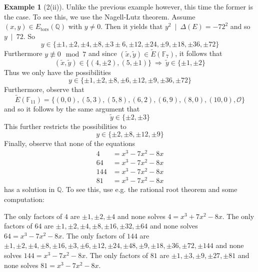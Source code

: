 \documentclass{scrartcl}
\newcommand{\F}{\mathbb{F}}
\newcommand{\Q}{\mathbb{Q}}
\renewcommand{\O}{\mathcal{O}}
\newcommand{\divides}{\ \mid \ }
\theoremstyle{definition}
\newtheorem{example}[subsection]{Example}
\begin{document}
\begin{example}[2(ii)]
    Unlike the previous example however, this time the former is the case.
    To see this, we use the Nagell-Lutz theorem.
    Assume $(x, y) \in E_{\mathrm{tors}}(\Q)$ with $y \neq 0$.
    Then it yields that $y^2 \divides \Delta(E) = -72^2$ and so $y \divides 72$.
    So
    \begin{equation*}
        y \in \{ \pm 1, \pm 2, \pm 4, \pm 8, \pm 3 \pm 6, \pm 12, \pm 24, \pm 9, \pm 18, \pm 36, \pm 72 \}
    \end{equation*}
    Furthermore $y \not\equiv 0 \mod 7$ and since $(\tilde{x}, \tilde{y}) \in \tilde{E}(\F_7)$, it follows that
    \begin{equation*}
        (\tilde{x}, \tilde{y}) \in \{ (4, \pm 2), (5, \pm 1) \} \ \Rightarrow \ \tilde{y} \in \{ \pm 1, \pm 2 \}
    \end{equation*}
    Thus we only have the possibilities
    \begin{equation*}
        y \in \{ \pm 1, \pm 2, \pm 8, \pm 6, \pm 12, \pm 9, \pm 36, \pm 72 \}
    \end{equation*}
    Furthermore, observe that
    \begin{equation*}
        \tilde{E}(\F_{11}) = \{ (0, 0), (5, 3), (5, 8), (6, 2), (6, 9), (8, 0), (10, 0), \O \}
    \end{equation*}
    and so it follows by the same argument that
    \begin{equation*}
        \tilde{y} \in \{ \pm 2, \pm 3 \}
    \end{equation*}
    This further restricts the possibilities to
    \begin{equation*}
        y \in \{ \pm 2, \pm 8, \pm 12, \pm 9 \}
    \end{equation*}
    Finally, observe that none of the equations
    \begin{align*}
        4 &= x^3 - 7x^2 - 8x \\
        64 &= x^3 - 7x^2 - 8x \\
        144 &= x^3 - 7x^2 - 8x \\
        81 &= x^3 - 7x^2 - 8x
    \end{align*}
    has a solution in $\Q$.
    To see this, use e.g. the rational root theorem and some computation:

    The only factors of $4$ are $\pm 1, \pm 2, \pm 4$ and none solves $4 = x^3 + 7x^2 - 8x$.
    The only factors of $64$ are $\pm 1, \pm 2, \pm 4, \pm 8, \pm 16, \pm 32, \pm 64$ and none solves $64 = x^3 - 7x^2 - 8x$.
    The only factors of $144$ are $\pm 1, \pm 2, \pm 4, \pm 8, \pm 16, \pm 3, \pm 6, \pm 12, \pm 24, \pm 48, \pm 9, \pm 18, \pm 36, \pm 72, \pm 144$ and none solves $144 = x^3 - 7x^2 - 8x$.
    The only factors of $81$ are $\pm 1, \pm 3, \pm 9, \pm 27, \pm 81$ and none solves $81 = x^3 - 7x^2 - 8x$.


\end{example}
\end{document}

